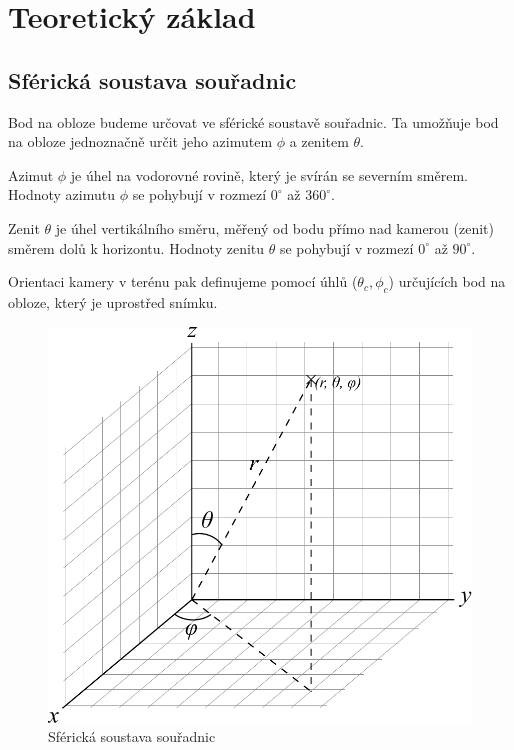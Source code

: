 


\chapter{Teoretický základ}
\section{Sférická soustava souřadnic}
Bod na obloze budeme určovat ve sférické soustavě souřadnic.
Ta umožňuje bod na obloze jednoznačně určit jeho azimutem $\phi$ a zenitem $\theta$.

\begin{definice}[Azimut]\label{def01:1}
  Azimut $\phi$ je úhel na vodorovné rovině, který je svírán se severním směrem. Hodnoty azimutu $\phi$ se pohybují v rozmezí $0^\circ$ až $360^\circ$.
\end{definice}

\begin{definice}[Zenit]\label{def01:2}
  Zenit $\theta$ je úhel vertikálního směru, měřený od bodu přímo nad kamerou (zenit) směrem dolů k horizontu. Hodnoty zenitu $\theta$ se pohybují v rozmezí $0^\circ$ až $90^\circ$.
\end{definice}

Orientaci kamery v terénu pak definujeme pomocí úhlů ($\theta_c, \phi_c$) určujících bod na obloze, který je uprostřed snímku.

\begin{figure}[h]\centering
  \includegraphics[width=130mm]{../img/spherical}
  \caption{Sférická soustava souřadnic \cite{wiki:spherical}}
\end{figure}


